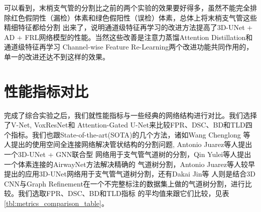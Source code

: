 可以看到，末梢支气管的分割比之前的两个实验的效果要好得多，虽然不能完全排除红色假阴性（漏检）体素和绿色假阳性（误检）体素，总体上将末梢支气管这些精细特征都给分割
出来了，说明通道级特征再学习的改进方法提高了3D-UNet + AD + FRL网络模型的性能。当然这些改善是注意力蒸馏Attention Distillation和通道级特征再学习
Channel-wise Feature Re-Learning两个改进功能共同作用的，单一的改进还达不到这样的效果。


\section{性能指标对比}

完成了综合实验之后，我们就性能指标与一些经典的网络结构进行对比。我们选择了V-Net\cite{Milletar2016VNetFC}, VoxResNet\cite{CHEN2018446}和
Attention-Gated U-Net\cite{Oktay2018AttentionUL}来比较FPR、DSC、BD和TLD四个指标。我们也跟State-of-the-art(SOTA)的几个方法，诸如Wang Chenglong
等人\cite{Wang2019TubularSegment}提出的使用空间全连接网络解决管状结构的分割问题, Antonio Juarez等人提出一个3D-UNet + GNN联合型
网络\cite{Juarez2019Joint3DUNetGraph}用于支气管气道树的分割，Qin Yulei等人\cite{Qin2019AirwayNet}提出一个体素连接的AirwayNet方法解决精确的
气道树分割，Antonio Juarez等人\cite{Juarez2018AutoAirwaySegment}较早提出的应用3D-UNet网络用于支气管气道树分割，还有Dakai Jin等
人\cite{Dakai2017GraphRefinement}则是结合3D CNN与Graph Refinement在一个不完整标注的数据集上做的气道树分割，进行比较。我们选取FPR、DSC、BD和TLD指标
的平均值来跟它们比较，见表\ref{tbl:metrics_comparison_table}。
